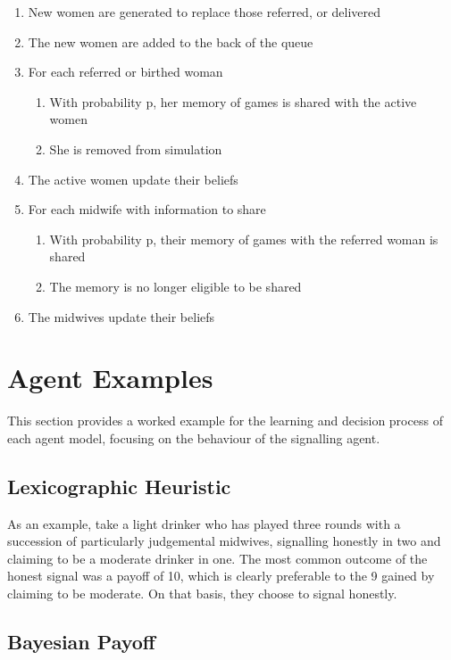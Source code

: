 \documentclass[graybox]{svmult}
\begin{document}
\begin{enumerate}
\begin{enumerate}
	\item New women are generated to replace those referred, or delivered
	\item The new women are added to the back of the queue
	\item For each referred or birthed woman
	\begin{enumerate}
		\item With probability p, her memory of games is shared with the active women
		\item She is removed from simulation
	\end{enumerate}
	\item The active women update their beliefs
	\item For each midwife with information to share
	\begin{enumerate}
		\item With probability p, their memory of games with the referred woman is shared
		\item The memory is no longer eligible to be shared
	\end{enumerate}
	\item The midwives update their beliefs
\end{enumerate}
\end{enumerate} \section{Agent Examples}
\label{sec:agent_eg}

This section provides a worked example for the learning and decision process of each agent model, focusing on the behaviour of the signalling agent.

\subsection{Lexicographic Heuristic}
\label{sub:lexico_eg}

As an example, take a light drinker who has played three rounds with a succession of particularly judgemental midwives, signalling honestly in two and claiming to be a moderate drinker in one. The most common outcome of the honest signal was a payoff of 10, which is clearly preferable to the 9 gained by claiming to be moderate. On that basis, they choose to signal honestly.

\subsection{Bayesian Payoff}
\label{sub:payoff_eg}
\end{document}
